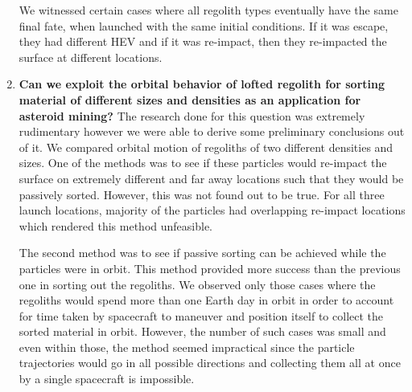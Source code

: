 \begin{enumerate}
We witnessed certain cases where all regolith types eventually have the same final fate, when launched with the same initial conditions. If it was escape, they had different \gls{HEV} and if it was re-impact, then they re-impacted the surface at different locations.

\item \textbf{Can we exploit the orbital behavior of lofted regolith for sorting material of different sizes and densities as an application for asteroid mining?}\newline
The research done for this question was extremely rudimentary however we were able to derive some preliminary conclusions out of it. We compared orbital motion of regoliths of two different densities and sizes. One of the methods was to see if these particles would re-impact the surface on extremely different and far away locations such that they would be passively sorted. However, this was not found out to be true. For all three launch locations, majority of the particles had overlapping re-impact locations which rendered this method unfeasible.

The second method was to see if passive sorting can be achieved while the particles were in orbit. This method provided more success than the previous one in sorting out the regoliths. We observed only those cases where the regoliths would spend more than one Earth day in orbit in order to account for time taken by spacecraft to maneuver and position itself to collect the sorted material in orbit. However, the number of such cases was small and even within those, the method seemed impractical since the particle trajectories would go in all possible directions and collecting them all at once by a single spacecraft is impossible.

\end{enumerate}
